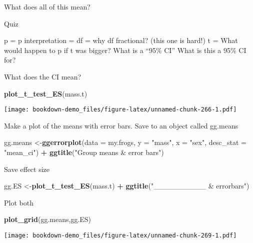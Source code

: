 \documentclass[]{book}
\newenvironment{Shaded}{\begin{snugshade}}{\end{snugshade}}
\newcommand{\KeywordTok}[1]{\textcolor[rgb]{0.13,0.29,0.53}{\textbf{#1}}}
\newcommand{\DataTypeTok}[1]{\textcolor[rgb]{0.13,0.29,0.53}{#1}}
\newcommand{\StringTok}[1]{\textcolor[rgb]{0.31,0.60,0.02}{#1}}
\newcommand{\OperatorTok}[1]{\textcolor[rgb]{0.81,0.36,0.00}{\textbf{#1}}}
\newcommand{\NormalTok}[1]{#1}
\theoremstyle{definition}
\theoremstyle{definition}
\theoremstyle{definition}
\theoremstyle{remark}
\begin{document}
What does all of this mean?

Quiz

p = p interpretation = df = why df fractional? (this one is hard!) t =
What would happen to p if t was bigger? What is a ``95\% CI'' What is
this a 95\% CI for?

What does the CI mean?

\begin{Shaded}
\begin{Highlighting}[]
\KeywordTok{plot_t_test_ES}\NormalTok{(mass.t)}
\end{Highlighting}
\end{Shaded}

\texttt{[image: bookdown-demo\_files/figure-latex/unnamed-chunk-266-1.pdf]}

Make a plot of the means with error bars. Save to an object called
gg.means

\begin{Shaded}
\begin{Highlighting}[]
\NormalTok{gg.means <-}\KeywordTok{ggerrorplot}\NormalTok{(}\DataTypeTok{data =}\NormalTok{ my.frogs,}
          \DataTypeTok{y =} \StringTok{"mass"}\NormalTok{,}
          \DataTypeTok{x =} \StringTok{"sex"}\NormalTok{,}
          \DataTypeTok{desc_stat =} \StringTok{"mean_ci"}\NormalTok{) }\OperatorTok{+}
\StringTok{  }\KeywordTok{ggtitle}\NormalTok{(}\StringTok{"Group means & error bars"}\NormalTok{)}
\end{Highlighting}
\end{Shaded}

Save effect size

\begin{Shaded}
\begin{Highlighting}[]
\NormalTok{gg.ES <-}\KeywordTok{plot_t_test_ES}\NormalTok{(mass.t) }\OperatorTok{+}
\StringTok{  }\KeywordTok{ggtitle}\NormalTok{(}\StringTok{"__________ & errorbars"}\NormalTok{)}
\end{Highlighting}
\end{Shaded}

Plot both

\begin{Shaded}
\begin{Highlighting}[]
\KeywordTok{plot_grid}\NormalTok{(gg.means,gg.ES)}
\end{Highlighting}
\end{Shaded}

\texttt{[image: bookdown-demo\_files/figure-latex/unnamed-chunk-269-1.pdf]}
\end{document}
